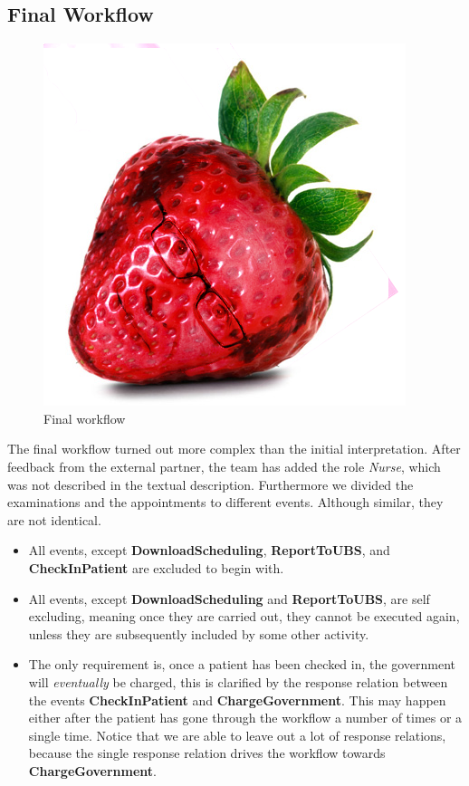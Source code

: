 \subsection{Final Workflow \label{sec:FinalWorkflow}}

\begin{figure}
\centering
\includegraphics[width=0.5\linewidth]{Figures/strawberry}
\caption{\label{fig:FinalWorkflow} Final workflow}
\end{figure}

The final workflow turned out more complex than the initial interpretation. After feedback from the external partner, the team has added the role \textit{Nurse}, which was not described in the textual description. Furthermore we divided the examinations and the appointments to different events. Although similar, they are not identical. 
\begin{itemize}
\item All events, except \textbf{DownloadScheduling}, \textbf{ReportToUBS}, and \textbf{CheckInPatient} are excluded to begin with.
\item All events, except \textbf{DownloadScheduling} and \textbf{ReportToUBS}, are self excluding, meaning once they are carried out, they cannot be executed again, unless they are subsequently included by some other activity. 
\item The only requirement is, once a patient has been checked in, the government will \textit{eventually} be charged, this is clarified by the response relation between the events \textbf{CheckInPatient} and \textbf{ChargeGovernment}. This may happen either after the patient has gone through the workflow a number of times or a single time. Notice that we are able to leave out a lot of response relations, because the single response relation drives the workflow towards \textbf{ChargeGovernment}.
\end{itemize}

